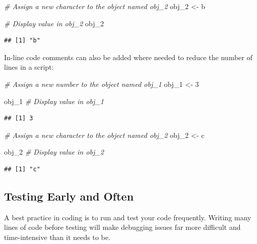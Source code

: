 \documentclass[
]{book}
\newenvironment{Shaded}{\begin{snugshade}}{\end{snugshade}}
\newcommand{\CommentTok}[1]{\textcolor[rgb]{0.56,0.35,0.01}{\textit{#1}}}
\newcommand{\DecValTok}[1]{\textcolor[rgb]{0.00,0.00,0.81}{#1}}
\newcommand{\NormalTok}[1]{#1}
\newcommand{\OtherTok}[1]{\textcolor[rgb]{0.56,0.35,0.01}{#1}}
\newcommand{\StringTok}[1]{\textcolor[rgb]{0.31,0.60,0.02}{#1}}
\begin{document}
\begin{Shaded}
\begin{Highlighting}[]
\CommentTok{\# Assign a new character to the object named obj\_2}
\NormalTok{obj\_2 }\OtherTok{\textless{}{-}} \StringTok{\textquotesingle{}b\textquotesingle{}}

\CommentTok{\# Display value in obj\_2}
\NormalTok{obj\_2}
\end{Highlighting}
\end{Shaded}

\begin{verbatim}
## [1] "b"
\end{verbatim}

In-line code comments can also be added where needed to reduce the number of lines in a script:

\begin{Shaded}
\begin{Highlighting}[]
\CommentTok{\# Assign a new number to the object named obj\_1}
\NormalTok{obj\_1 }\OtherTok{\textless{}{-}} \DecValTok{3}

\NormalTok{obj\_1 }\CommentTok{\# Display value in obj\_1}
\end{Highlighting}
\end{Shaded}

\begin{verbatim}
## [1] 3
\end{verbatim}

\begin{Shaded}
\begin{Highlighting}[]
\CommentTok{\# Assign a new character to the object named obj\_2}
\NormalTok{obj\_2 }\OtherTok{\textless{}{-}} \StringTok{\textquotesingle{}c\textquotesingle{}} 

\NormalTok{obj\_2 }\CommentTok{\# Display value in obj\_2}
\end{Highlighting}
\end{Shaded}

\begin{verbatim}
## [1] "c"
\end{verbatim}

\hypertarget{testing-early-and-often}{%
\subsection{Testing Early and Often}\label{testing-early-and-often}}

A best practice in coding is to run and test your code frequently. Writing many lines of code before testing will make debugging issues far more difficult and time-intensive than it needs to be.
\end{document}

